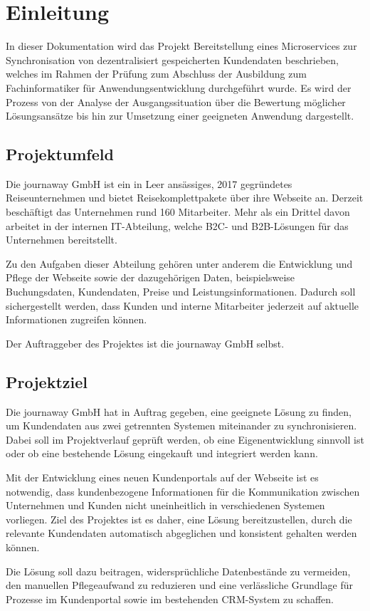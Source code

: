 \section{Einleitung}
\label{sec:Einleitung}
In dieser Dokumentation wird das Projekt \glqq Bereitstellung eines Microservices
zur Synchronisation von dezentralisiert gespeicherten Kundendaten\grqq{} beschrieben,
welches im Rahmen der Prüfung zum Abschluss der Ausbildung zum Fachinformatiker für Anwendungsentwicklung
durchgeführt wurde.
Es wird der Prozess von der Analyse der Ausgangssituation über die Bewertung möglicher Lösungsansätze
bis hin zur Umsetzung einer geeigneten Anwendung dargestellt.


\subsection{Projektumfeld} 
\label{sec:Projektumfeld}
Die journaway GmbH ist ein in Leer ansässiges, 2017 gegründetes Reiseunternehmen
und bietet Reisekomplettpakete über ihre Webseite an.
Derzeit beschäftigt das Unternehmen rund 160 Mitarbeiter.
Mehr als ein Drittel davon arbeitet in der internen IT-Abteilung,
welche B2C- und B2B-Lösungen für das Unternehmen bereitstellt.
\par\smallskip
Zu den Aufgaben dieser Abteilung gehören unter anderem die Entwicklung und Pflege der Webseite
sowie der dazugehörigen Daten, beispielsweise Buchungsdaten, Kundendaten, Preise und Leistungsinformationen.
Dadurch soll sichergestellt werden, dass Kunden und interne Mitarbeiter jederzeit auf aktuelle Informationen zugreifen können.
\par\smallskip
Der Auftraggeber des Projektes ist die journaway GmbH selbst.


\subsection{Projektziel} 
\label{sec:Projektziel}
Die journaway GmbH hat in Auftrag gegeben, eine geeignete Lösung zu finden,
um Kundendaten aus zwei getrennten Systemen miteinander zu synchronisieren.
Dabei soll im Projektverlauf geprüft werden, ob eine Eigenentwicklung sinnvoll ist
oder ob eine bestehende Lösung eingekauft und integriert werden kann.
\par\smallskip
Mit der Entwicklung eines neuen Kundenportals auf der Webseite ist es notwendig,
dass kundenbezogene Informationen für die Kommunikation zwischen Unternehmen und Kunden
nicht uneinheitlich in verschiedenen Systemen vorliegen.
Ziel des Projektes ist es daher, eine Lösung bereitzustellen,
durch die relevante Kundendaten automatisch abgeglichen und konsistent gehalten werden können.
\par\smallskip
Die Lösung soll dazu beitragen, widersprüchliche Datenbestände zu vermeiden,
den manuellen Pflegeaufwand zu reduzieren und eine verlässliche Grundlage für Prozesse im Kundenportal
sowie im bestehenden CRM-System zu schaffen.


